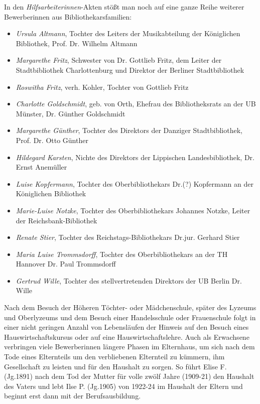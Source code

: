 \documentclass[a4paper,
fontsize=11pt,
oneside,
numbers=noperiodatend,
parskip=half-,
bibliography=totoc,
final
]{scrartcl}
\begin{document}
In den \emph{Hilfsarbeiterinnen}-Akten stößt man noch auf eine ganze
Reihe weiterer Bewerberinnen aus Bibliothekarsfamilien:

\begin{itemize}
\item
  \emph{Ursula Altmann}, Tochter des Leiters der Musikabteilung der
  Königlichen Bibliothek, Prof. Dr. Wilhelm Altmann
\item
  \emph{Margarethe Fritz}, Schwester von Dr. Gottlieb Fritz, dem Leiter
  der Stadtbibliothek Charlottenburg und Direktor der Berliner
  Stadtbibliothek
\item
  \emph{Roswitha Fritz}, verh. Kohler, Tochter von Gottlieb Fritz
\item
  \emph{Charlotte Goldschmidt}, geb. von Orth, Ehefrau des
  Bibliotheksrats an der UB Münster, Dr. Günther Goldschmidt
\item
  \emph{Margarethe Günther}, Tochter des Direktors der Danziger
  Stadtbibliothek, Prof. Dr. Otto Günther
\item
  \emph{Hildegard Karsten}, Nichte des Direktors der Lippischen
  Landesbibliothek, Dr. Ernst Anemüller
\item
  \emph{Luise Kopfermann}, Tochter des Oberbibliothekars Dr.(?)
  Kopfermann an der Königlichen Bibliothek
\item
  \emph{Marie-Luise Notzke}, Tochter des Oberbibliothekars Johannes
  Notzke, Leiter der Reichsbank-Bibliothek
\item
  \emph{Renate Stier}, Tochter des Reichstags-Bibliothekars Dr.jur.
  Gerhard Stier
\item
  \emph{Maria Luise Trommsdorff}, Tochter des Oberbibliothekars an der
  TH Hannover Dr. Paul Tromms\-dorff
\item
  \emph{Gertrud Wille}, Tochter des stellvertretenden Direktors der UB
  Berlin Dr. Wille
\end{itemize}

Nach dem Besuch der Höheren Töchter- oder Mädchenschule, später des
Lyzeums und Oberlyzeums und dem Besuch einer Handelsschule oder
Frauenschule folgt in einer nicht geringen Anzahl von Lebensläufen der
Hinweis auf den Besuch eines Hauswirtschaftskursus oder auf eine
Hauswirtschaftslehre. Auch als Erwachsene verbringen viele Bewerberinnen
längere Phasen im Elternhaus, um sich nach dem Tode eines Elternteils um
den verbliebenen Elternteil zu kümmern, ihm Gesellschaft zu leisten und
für den Haushalt zu sorgen. So führt Elise F. (Jg.1891) nach dem Tod der
Mutter für volle zwölf Jahre (1909-21) den Haushalt des Vaters und lebt
Ilse P. (Jg.1905) von 1922-24 im Haushalt der Eltern und beginnt erst
dann mit der Berufsausbildung.
\end{document}
